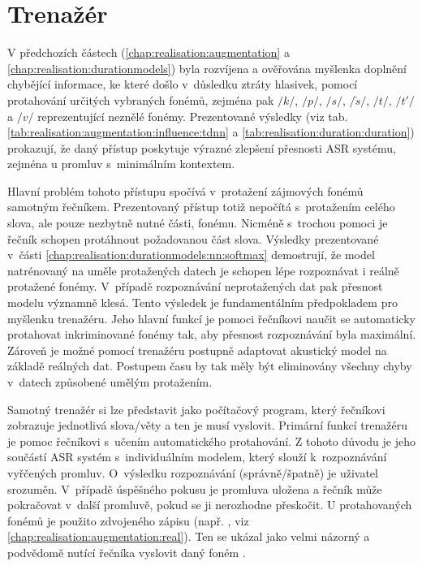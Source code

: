 \section{Trenažér}
\label{chap:realisation:trainer}

V předchozích částech (\ref{chap:realisation:augmentation} a \ref{chap:realisation:durationmodels}) byla rozvíjena a ověřována myšlenka doplnění chybějící informace, ke které došlo v~důsledku ztráty hlasivek, pomocí protahování určitých vybraných fonémů, zejména pak $/k/$, $/p/$, $/s/$, $/\check{s}/$, $/t/$, $/t'/$ a $/v/$ reprezentující neznělé fonémy. Prezentované výsledky (viz tab. \ref{tab:realisation:augmentation:influence:tdnn} a \ref{tab:realisation:duration:duration}) prokazují, že daný přístup poskytuje výrazné zlepšení přesnosti ASR systému, zejména u promluv s~minimálním kontextem.

Hlavní problém tohoto přístupu spočívá v~protažení zájmových fonémů samotným řečníkem. Prezentovaný přístup totiž nepočítá s~protažením celého slova, ale pouze nezbytně nutné části, fonému. Nicméně s~trochou pomoci je řečník schopen protáhnout požadovanou část slova. Výsledky prezentované v~části \ref{chap:realisation:durationmodels:nn:softmax} demostrují, že model natrénovaný na uměle protažených datech je schopen lépe rozpoznávat i reálně protažené fonémy. V~případě rozpoznávání neprotažených dat pak přesnost modelu významně klesá. Tento výsledek je fundamentálním předpokladem pro myšlenku trenažéru. Jeho hlavní funkcí je pomoci řečníkovi naučit se automaticky protahovat inkriminované fonémy tak, aby přesnost rozpoznávání byla maximální. Zároveň je možné pomocí trenažéru postupně adaptovat akustický model na základě reálných dat. Postupem času by tak měly být eliminovány všechny chyby v~datech způsobené umělým protažením.

Samotný trenažér si lze představit jako počítačový program, který řečníkovi zobrazuje jednotlivá slova/věty a ten je musí vyslovit. Primární funkcí trenažéru je pomoc řečníkovi s~učením automatického protahování. Z tohoto důvodu je jeho součástí ASR systém s~individuálním modelem, který slouží  k~rozpoznávání vyřčených promluv. O~výsledku rozpoznávání (správně/špatně) je uživatel srozuměn. V~případě úspěšného pokusu je promluva uložena a řečník může pokračovat v~další promluvě, pokud se ji nerozhodne přeskočit. U protahovaných fonémů je použito zdvojeného zápisu (např. \textit{}, viz \ref{chap:realisation:augmentation:real}). Ten se ukázal jako velmi názorný a podvědomě nutící řečníka vyslovit daný foném .

